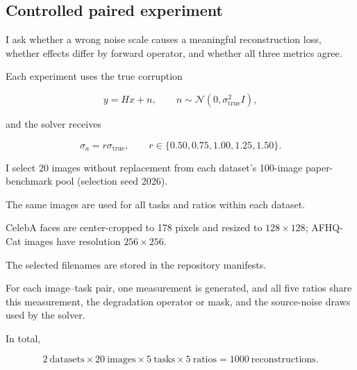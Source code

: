 \documentclass[11pt,a4paper]{article}
\newcommand{\Normal}{\mathcal{N}}
\newcommand{\sx}{\sigma_{\mathrm{true}}}
\newcommand{\sa}{\sigma_a}
\begin{document}
\subsection{Controlled paired experiment}

I ask whether a wrong noise scale causes a meaningful reconstruction
loss, whether effects differ by forward operator, and whether all
three metrics agree.

Each experiment uses the true corruption

\begin{equation}
    y=Hx+n,
    \qquad
    n\sim\Normal(0,\sx^2 I),
\end{equation}

and the solver receives

\begin{equation}
    \sa=r\sx,
    \qquad
    r\in\{0.50,0.75,1.00,1.25,1.50\}.
\end{equation}

I select 20 images without replacement from each dataset's
100-image paper-benchmark pool (selection seed 2026).

The same images are used for all tasks and ratios within each dataset.

CelebA faces are center-cropped to 178 pixels and resized
to $128\times128$; AFHQ-Cat images have resolution $256\times256$.

The selected filenames are stored in the repository manifests.

For each image--task pair, one measurement is generated,
and all five ratios share this measurement, the degradation
operator or mask, and the source-noise draws used by the solver.

In total,

\begin{equation}
    2\ \text{datasets}
    \times
    20\ \text{images}
    \times
    5\ \text{tasks}
    \times
    5\ \text{ratios}
    =
    1000\ \text{reconstructions}.
    \label{eq:count}
\end{equation}
\end{document}
